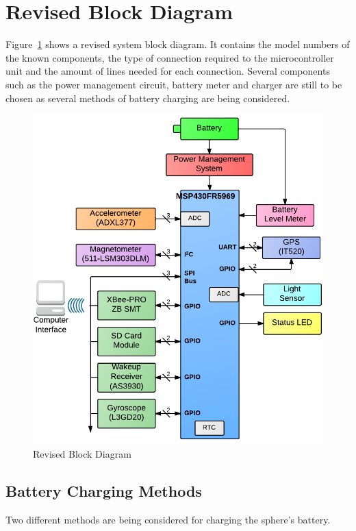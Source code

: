 \section{Revised Block Diagram}

Figure~\ref{fig:blockDiagram} shows a revised system block diagram.  It contains the model numbers of the known components, the type of connection required to the microcontroller unit and the amount of lines needed for each connection.  Several components such as the power management circuit, battery meter and charger are still to be chosen as several methods of battery charging are being considered.

\begin{figure}[H]
	\centering
	\includegraphics[width=\textwidth]{img/blockDiagramV2_2}
	\caption{Revised Block Diagram \label{fig:blockDiagram}}
\end{figure}

\subsection{Battery Charging Methods}
Two different methods are being considered for charging the sphere's battery.
